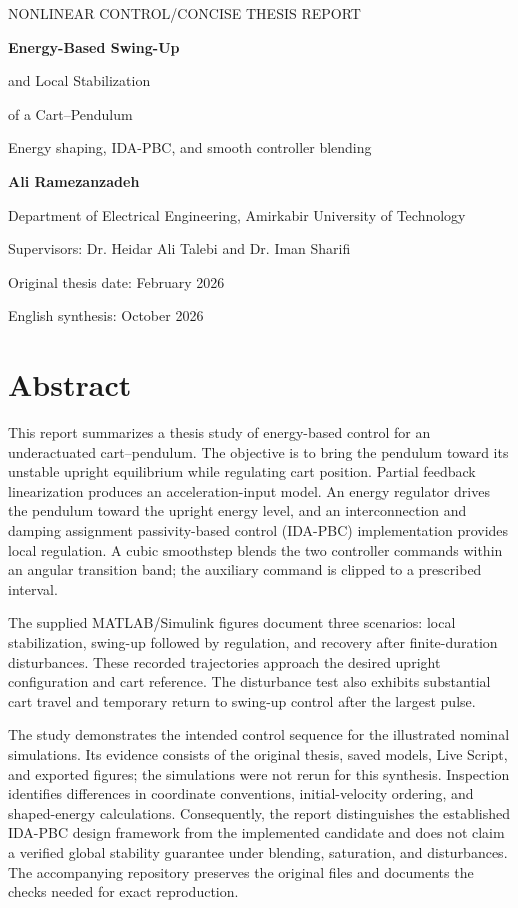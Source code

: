 \documentclass[11pt,a4paper]{article}
\newcommand{\reportsection}[1]{\section*{\color{navy}#1}}
\begin{document}
\thispagestyle{plain}
{\small\sffamily\color{teal}NONLINEAR CONTROL\quad /\quad CONCISE THESIS REPORT}
\vspace{8mm}

{\fontsize{26}{30}\selectfont\bfseries\color{navy}
Energy-Based Swing-Up\par
and Local Stabilization\par
of a Cart--Pendulum\par}
\vspace{4mm}
{\large\color{muted}Energy shaping, IDA-PBC, and smooth controller blending}

\vspace{6mm}
{\Large\bfseries Ali Ramezanzadeh}\par
Department of Electrical Engineering, Amirkabir University of Technology\par
Supervisors: Dr. Heidar Ali Talebi and Dr. Iman Sharifi\par
Original thesis date: February 2026\par
English synthesis: October 2026

\reportsection{Abstract}
This report summarizes a thesis study of energy-based control for an underactuated cart--pendulum. The objective is to bring the pendulum toward its unstable upright equilibrium while regulating cart position. Partial feedback linearization produces an acceleration-input model. An energy regulator drives the pendulum toward the upright energy level, and an interconnection and damping assignment passivity-based control (IDA-PBC) implementation provides local regulation. A cubic smoothstep blends the two controller commands within an angular transition band; the auxiliary command is clipped to a prescribed interval.

The supplied MATLAB/Simulink figures document three scenarios: local stabilization, swing-up followed by regulation, and recovery after finite-duration disturbances. These recorded trajectories approach the desired upright configuration and cart reference. The disturbance test also exhibits substantial cart travel and temporary return to swing-up control after the largest pulse.

The study demonstrates the intended control sequence for the illustrated nominal simulations. Its evidence consists of the original thesis, saved models, Live Script, and exported figures; the simulations were not rerun for this synthesis. Inspection identifies differences in coordinate conventions, initial-velocity ordering, and shaped-energy calculations. Consequently, the report distinguishes the established IDA-PBC design framework from the implemented candidate and does not claim a verified global stability guarantee under blending, saturation, and disturbances. The accompanying repository preserves the original files and documents the checks needed for exact reproduction.
\end{document}
